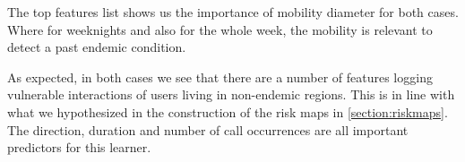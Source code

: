 \begin{table}[ht]
    \centering
    \caption{A representation of the top features that resulted from the Random Forest experiment on \cref{target4}. }\label{tab:random_forest_big_experiment_best_features}
\end{table}


The top features list shows us the importance of mobility diameter for both cases.
Where for weeknights and also for the whole week, the mobility is relevant to detect a past endemic condition.

As expected, in both cases we see that there are a number of features logging vulnerable interactions of users living in non-endemic regions.
This is in line with what we hypothesized in the construction of the risk maps in \cref{section:riskmaps}.
The direction, duration and number of call occurrences are all important predictors for this learner.

